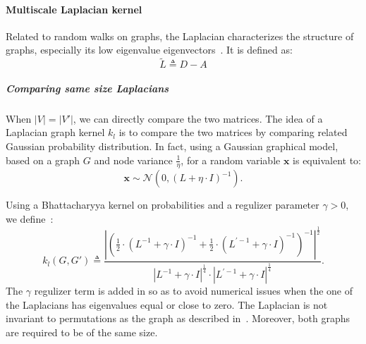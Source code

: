             \paragraph{Multiscale Laplacian kernel}
                Related to random walks on graphs, the Laplacian characterizes the structure of graphs, especially its low eigenvalue eigenvectors~\parencite{kondor2016multiscale}.
                It is defined as:
                \begin{equation}
                    \label{eq::laplacian_graph}
                    \widetilde{L} \triangleq D - A
                \end{equation}

                \subparagraph{Comparing same size Laplacians}
                    When $\vert V \vert = \vert V' \vert$, we can directly compare the two matrices.
                    The idea of a Laplacian graph kernel $k_{l}$ is to compare the two matrices by comparing related Gaussian probability distribution.
                    In fact, using a Gaussian graphical model, based on a graph $G$ and node variance $\frac{1}{\eta}$, for a random variable $\bm{x}$ is equivalent to:
                    \begin{equation}
                        \label{eq::guassian_gm}
                        \bm{x} \sim \mathscr{N}\left(0, \left(L + \eta \cdot I\right)^{-1}\right).
                    \end{equation}

                    Using a Bhattacharyya kernel on probabilities and a regulizer parameter $\gamma>0$, we define~\parencite{kondor2016multiscale}:
                    \begin{equation}
                        \label{eq::laplacian_kernel}
                        k_{l}(G, G') \triangleq \frac{\left\lvert \left(\frac{1}{2} \cdot \left(L^{-1}+\gamma\cdot I\right)^{-1} + \frac{1}{2} \cdot \left(L^{\prime -1}+\gamma\cdot I\right)^{-1} \right)^{-1} \right\rvert^{\frac{1}{2}}}{\left\lvert L^{-1} + \gamma \cdot I\right\rvert^{\frac{1}{4}}\cdot\left\lvert L^{\prime -1} + \gamma \cdot I\right\rvert^{\frac{1}{4}}}.
                    \end{equation}
                    The \(\gamma\) regulizer term is added in so as to avoid numerical issues when the one of the Laplacians has eigenvalues equal or close to zero.
                    The Laplacian is not invariant to permutations as the graph as described in~\textcite{kondor2016multiscale}.
                    Moreover, both graphs are required to be of the same size.\\

